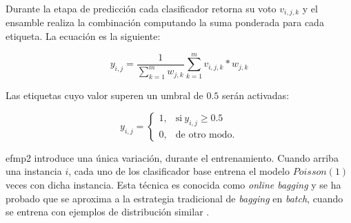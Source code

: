 Durante la etapa de predicción cada clasificador retorna su voto $v_{i,j,k}$ y
el ensamble realiza la combinación computando la suma ponderada para cada
etiqueta. La ecuación es la siguiente:

\begin{equation}
	y_{i,j} = \frac{1}{\sum_{k=1}^{m} w_{j,k}} \sum_{k=1}^{m} v_{i,j,k} *
	w_{j,k}
\end{equation}

Las etiquetas cuyo valor superen un umbral de $0.5$ serán activadas:

\begin{equation}
	y_{i,j} =
	\begin{cases}
		1, & \text{si}\ y_{i,j} \geq 0.5 \\
		0, & \text{de otro modo.}
	\end{cases}
\end{equation}

\acrshort{efmp2} introduce una única variación, durante el entrenamiento. Cuando
arriba una instancia $i$, cada uno de los clasificador base entrena el modelo
$Poisson(1)$ veces con dicha instancia. Esta técnica es conocida como
\textit{online bagging} y se ha probado que se aproxima a la estrategia
tradicional de \textit{bagging} en \textit{batch}, cuando se entrena con
ejemplos de distribución similar \cite{oza_online_2005}.
